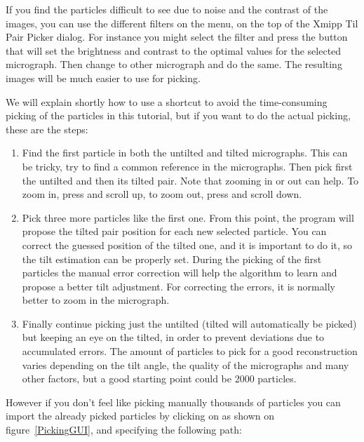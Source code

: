 \documentclass[12pt]{article} %
\begin{document}
If you find the particles difficult to see due to noise and the
contrast of the images, you can use the different filters on the
 menu, on the top of the Xmipp Til Pair Picker dialog.
For instance you might select the 
filter and press the  button that will set the brightness
and contrast to the optimal values for the selected micrograph. Then
change to other micrograph and do the same. The resulting images will
be much easier to use for picking.

We will explain shortly how to use a shortcut to avoid the
time-consuming picking of the particles in this tutorial, but if you
want to do the actual picking, these are the steps:

\begin{enumerate}

\item Find the first particle in both the untilted and tilted
  micrographs. This can be tricky, try to find a common reference in
  the micrographs. Then pick first the untilted and then its tilted
  pair. Note that zooming in or out can help. To zoom in, press
   and scroll up, to zoom out, press  and
  scroll down.

\item Pick three more particles like the first one. From this point,
  the program will propose the tilted pair position for each new
  selected particle. You can correct the guessed position of the
  tilted one, and it is important to do it, so the tilt estimation can
  be properly set. During the picking of the first particles the
  manual error correction will help the algorithm to learn and propose
  a better tilt adjustment. For correcting the errors, it is normally
  better to zoom in the micrograph.

\item Finally continue picking just the untilted (tilted will
  automatically be picked) but keeping an eye on the tilted, in order
  to prevent deviations due to accumulated errors. The amount of
  particles to pick for a good reconstruction varies depending on the
  tilt angle, the quality of the micrographs and many other factors,
  but a good starting point could be 2000 particles.

\end{enumerate}

However if you don't feel like picking manually thousands of particles
you can import the already picked particles by clicking on  as shown on figure~\ref{PickingGUI}, and
specifying the following path:
\end{document}
